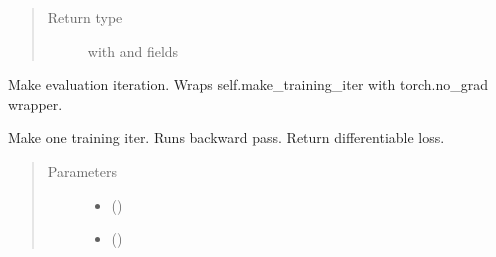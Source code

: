 \documentclass[letterpaper,10pt,english]{sphinxmanual}
\begin{document}
\begin{fulllineitems}
\begin{fulllineitems}
\begin{quote}
\begin{description}
\begin{itemize}
\end{itemize}


\item[{Return type}] \leavevmode
{} with  and  fields

\end{description}\end{quote}

\end{fulllineitems}


\begin{fulllineitems}
\label{\detokenize{api/autoencoding:geology.metamodelling.SpatialAutoencoder.make_evaluation_iter}}
Make evaluation iteration.
Wraps self.make\_training\_iter with torch.no\_grad wrapper.

\end{fulllineitems}


\begin{fulllineitems}
\label{\detokenize{api/autoencoding:geology.metamodelling.SpatialAutoencoder.make_training_iter}}
Make one training iter. Runs backward pass. Return differentiable loss.
\begin{quote}\begin{description}
\item[{Parameters}] \leavevmode\begin{itemize}
\item {} 
 () \textendash{} 

\item {} 
 () \textendash{} 


\end{itemize}
\end{description}
\end{quote}
\end{fulllineitems}
\end{fulllineitems}
\end{document}
